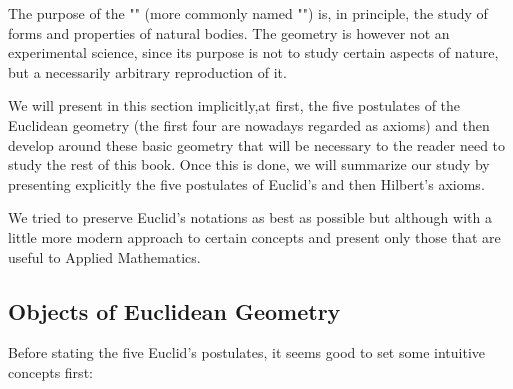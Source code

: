 	The purpose of the "" (more commonly named "") is, in principle, the study of forms and properties of natural bodies. The geometry is however not an experimental science, since its purpose is not to study certain aspects of nature, but a necessarily arbitrary reproduction of it.

We will present in this section implicitly,at first, the five postulates of the Euclidean geometry (the first four are nowadays regarded as axioms) and then develop around these basic geometry that will be necessary to the reader need to study the rest of this book. Once this is done, we will summarize our study by presenting explicitly the five postulates of Euclid's and then Hilbert's axioms.

	\begin{tcolorbox}[title=Remark,colframe=black,arc=10pt]
We tried to preserve Euclid's notations as best as possible but although with a little more modern approach to certain concepts and present only those that are useful to Applied Mathematics.
	\end{tcolorbox}
	
	\subsection{Objects of Euclidean Geometry}
	
	Before stating the five Euclid's postulates, it seems good to set some intuitive concepts first:
	
